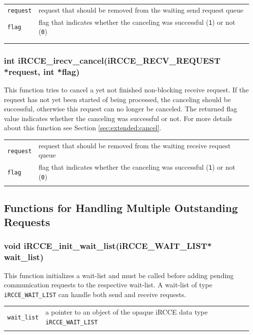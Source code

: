 \documentclass[fontsize=10pt, paper=a4, DIV12, pagesize=auto]{scrartcl}
\begin{document}
\begin{tabular}{ll}
\texttt{request} & request that should be removed from the waiting send request queue \\
\texttt{flag}    & flag that indicates whether the canceling was successful (\texttt{1}) or not (\texttt{0}) \\\\
\hspace{2.0cm}
\end{tabular}


\subsubsection{int iRCCE\_irecv\_cancel(iRCCE\_RECV\_REQUEST *request, int *flag)}\vspace{-0.3cm}
This function tries to cancel a yet not finished non-blocking receive request.
If the request has not yet been started of being processed, the canceling should be successful, otherwise this request can no longer be canceled.
The returned flag value indicates whether the canceling was successful or not.
For more details about this function see Section \ref{sec:extended:cancel}.

\begin{tabular}{ll}
\texttt{request} & request that should be removed from the waiting receive request queue \\
\texttt{flag}    & flag that indicates whether the canceling was successful (\texttt{1}) or not (\texttt{0}) \\
\hspace{2.0cm}
\end{tabular}


\subsection{Functions for Handling Multiple Outstanding Requests}
\enlargethispage{0.3cm}

\subsubsection{void iRCCE\_init\_wait\_list(iRCCE\_WAIT\_LIST* wait\_list)}\vspace{-0.3cm}
This function initializes a wait-list and must be called before adding pending communication requests to the respective wait-list.
A wait-list of type \texttt{iRCCE\_WAIT\_LIST} can handle both send and receive requests.

\begin{tabular}{ll}
\texttt{wait\_list} & a pointer to an object of the opaque iRCCE data type \texttt{iRCCE\_WAIT\_LIST} \\
\hspace{2.0cm}
\end{tabular}
\end{document}
